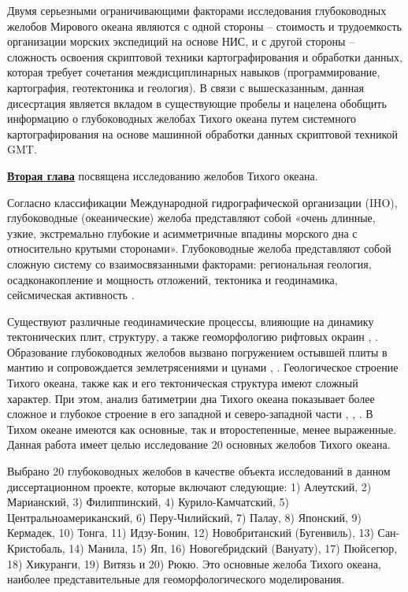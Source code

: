 Двумя серьезными ограничивающими факторами исследования глубоководных желобов Мирового океана являются с одной стороны –  стоимость и трудоемкость организации морских экспедиций на основе НИС, и с другой стороны – сложность освоения скриптовой техники картографирования и обработки данных, которая требует сочетания междисциплинарных навыков (программирование, картография, геотектоника и геология). В связи с вышесказанным, данная дисесртация является вкладом в существующие пробелы и нацелена обобщить информацию о глубоководных желобах Тихого океана путем системного картографирования на основе машинной обработки данных скриптовой техникой GMT.

\underline{\textbf{Вторая глава}} посвящена исследованию желобов Тихого океана.

Согласно классификации Международной гидрографической организации (IHO), глубоководные (океанические) желоба представляют собой «очень длинные, узкие, экстремально глубокие и асимметричные впадины морского дна с относительно крутыми сторонами». Глубоководные желоба представляют собой сложную систему со взаимосвязанными факторами: региональная геология, осадконакопление и мощность отложений, тектоника и геодинамика, сейсмическая активность \cite{АндрееваРодкин}. 

Существуют различные геодинамические процессы, влияющие на динамику тектонических плит, структуру, а также геоморфологию рифтовых окраин \cite{Удинцев1974}, \cite{Белоусов1954}. Образование глубоководных желобов вызвано погружением остывшей плиты в мантию и сопровождается землетрясениями и цунами \cite{Белоусов1968}, \cite{Блюман2013}. Геологическое строение Тихого океана, также как и его тектоническая структура имеют сложный характер. При этом, анализ батиметрии дна Тихого океана показывает более сложное и глубокое строение в его западной и северо-западной части \cite{Васильев2009}, \cite{Васильев1989}, \cite{Гайнанов}. В Тихом океане имеются как основные, так и второстепенные, менее выраженные. Данная работа имеет целью исследование 20 основных желобов Тихого океана. 

	Выбрано 20 глубоководных желобов в качестве объекта исследований в данном диссертационном проекте, которые включают следующие: 1) Алеутский, 2) Марианский, 3) Филиппинский, 4) Курило-Камчатский, 5) Центральноамериканский, 6) Перу-Чилийский, 7) Палау, 8) Японский, 9) Кермадек, 10) Тонга, 11) Идзу-Бонин, 12) Новобританский (Бугенвиль), 13) Сан-Кристобаль, 14) Манила, 15) Яп, 16) Новогебридский (Вануату), 17) Пюйсегюр, 18) Хикуранги, 19) Витязь и 20) Рюкю. Это основные желоба Тихого океана, наиболее представительные для геоморфологического моделирования. 
	
